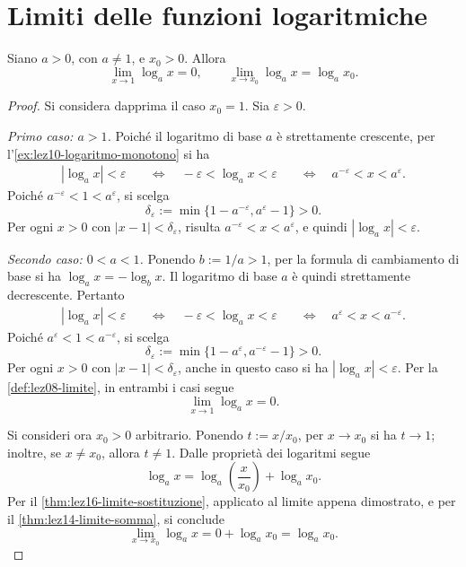 \clearpage

\section{Limiti delle funzioni logaritmiche}
\label{sec:lez20-limiti-logaritmo}

\begin{proposition}
\label{prop:lez20-limiti-logaritmo}
Siano \(a>0\), con \(a\ne1\), e \(x_0>0\). Allora
\[
  \lim_{x\to1}\log_a x=0,
  \qquad
  \lim_{x\to x_0}\log_a x=\log_a x_0.
\]
\end{proposition}

\begin{proof}
Si considera dapprima il caso \(x_0=1\).
Sia \(\varepsilon>0\).

\emph{Primo caso: \(a>1\).}
Poiché il logaritmo di base \(a\) è strettamente
crescente, per l'\cref{ex:lez10-logaritmo-monotono}
si ha
\[
\begin{aligned}
  |\log_a x|<\varepsilon
  &\quad\Longleftrightarrow\quad
    -\varepsilon<\log_a x<\varepsilon
  &\quad\Longleftrightarrow\quad
    a^{-\varepsilon}<x<a^\varepsilon.
\end{aligned}
\]
Poiché \(a^{-\varepsilon}<1<a^\varepsilon\),
si scelga
\[
  \delta_\varepsilon
  :=\min\{1-a^{-\varepsilon},a^\varepsilon-1\}>0.
\]
Per ogni \(x>0\) con \(|x-1|<\delta_\varepsilon\),
risulta \(a^{-\varepsilon}<x<a^\varepsilon\),
e quindi \(|\log_a x|<\varepsilon\).

\emph{Secondo caso: \(0<a<1\).}
Ponendo \(b:=1/a>1\), per la formula di cambiamento
di base si ha \(\log_a x=-\log_b x\).
Il logaritmo di base \(a\) è quindi strettamente
decrescente. Pertanto
\[
\begin{aligned}
  |\log_a x|<\varepsilon
  &\quad\Longleftrightarrow\quad
    -\varepsilon<\log_a x<\varepsilon
  &\quad\Longleftrightarrow\quad
    a^\varepsilon<x<a^{-\varepsilon}.
\end{aligned}
\]
Poiché \(a^\varepsilon<1<a^{-\varepsilon}\),
si scelga
\[
  \delta_\varepsilon
  :=\min\{1-a^\varepsilon,a^{-\varepsilon}-1\}>0.
\]
Per ogni \(x>0\) con \(|x-1|<\delta_\varepsilon\),
anche in questo caso si ha
\(|\log_a x|<\varepsilon\).
Per la \cref{def:lez08-limite}, in entrambi i casi
segue
\[
  \lim_{x\to1}\log_a x=0.
\]

Si consideri ora \(x_0>0\) arbitrario. Ponendo
\(t:=x/x_0\), per \(x\to x_0\) si ha \(t\to1\);
inoltre, se \(x\ne x_0\), allora \(t\ne1\).
Dalle proprietà dei logaritmi segue
\[
  \log_a x=\log_a\left(\frac{x}{x_0}\right)
          +\log_a x_0.
\]
Per il \cref{thm:lez16-limite-sostituzione},
applicato al limite appena dimostrato, e per il
\cref{thm:lez14-limite-somma}, si conclude
\[
  \lim_{x\to x_0}\log_a x
  =0+\log_a x_0=\log_a x_0.
\]
\end{proof}

